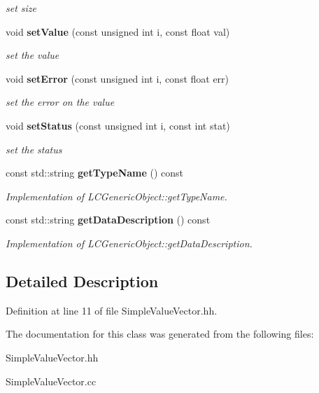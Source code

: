\begin{DoxyCompactItemize}
\begin{DoxyCompactList}\small\item\em set size \item\end{DoxyCompactList}\item 
void {\bf setValue} (const unsigned int i, const float val)\label{classCALICE_1_1SimpleValueVector_a69145f7cac58a0b27195625af458e2af}

\begin{DoxyCompactList}\small\item\em set the value \item\end{DoxyCompactList}\item 
void {\bf setError} (const unsigned int i, const float err)\label{classCALICE_1_1SimpleValueVector_aff7e70fd83747cd55597230fbd9ddcec}

\begin{DoxyCompactList}\small\item\em set the error on the value \item\end{DoxyCompactList}\item 
void {\bf setStatus} (const unsigned int i, const int stat)\label{classCALICE_1_1SimpleValueVector_aa25bc9084b4859751e49f17e45c01662}

\begin{DoxyCompactList}\small\item\em set the status \item\end{DoxyCompactList}\item 
const std::string {\bf getTypeName} () const \label{classCALICE_1_1SimpleValueVector_ad521e9fdf796c74a216d3028dad16883}

\begin{DoxyCompactList}\small\item\em Implementation of LCGenericObject::getTypeName. \item\end{DoxyCompactList}\item 
const std::string {\bf getDataDescription} () const \label{classCALICE_1_1SimpleValueVector_a7c7524dbd63b69b0a6daa100f1f36421}

\begin{DoxyCompactList}\small\item\em Implementation of LCGenericObject::getDataDescription. \item\end{DoxyCompactList}\end{DoxyCompactItemize}


\subsection{Detailed Description}


Definition at line 11 of file SimpleValueVector.hh.

The documentation for this class was generated from the following files:\begin{DoxyCompactItemize}
\item 
SimpleValueVector.hh\item 
SimpleValueVector.cc\end{DoxyCompactItemize}
